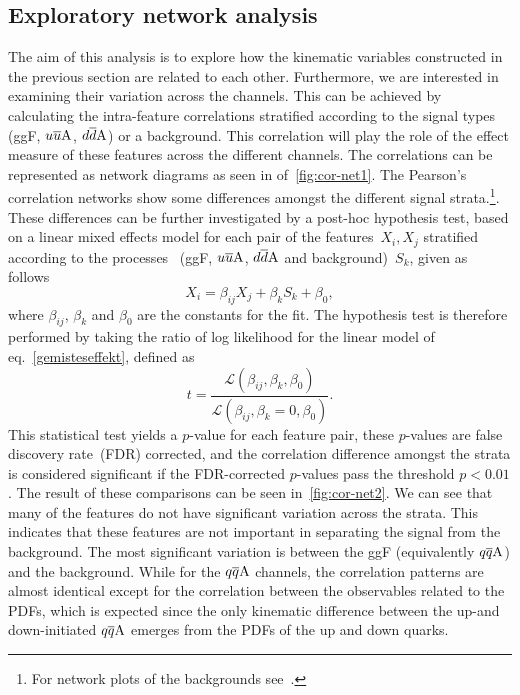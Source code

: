 \subsection{ Exploratory network analysis}
The aim of this analysis is to explore how the kinematic variables constructed in the previous section are related to each other. Furthermore, we are interested in examining their variation across the channels.  This can be achieved by calculating the intra-feature correlations stratified according to the signal types (ggF, $u\overline u \rm A$, $d\overline d \rm A$) or a background. This correlation will play the role of the effect measure of these features across the different channels. The correlations can  be represented as network diagrams as seen in of~\autoref{fig:cor-net1}. The Pearson's correlation networks show some differences amongst the different signal strata.\footnote{For network plots of the backgrounds see~\cite{Grojean:2020ech}.}. These differences can be further investigated by a post-hoc hypothesis test, based on a linear mixed effects model for each pair of the features~$X_i, X_j$ stratified according to the processes ~(ggF, $u\overline u \rm A$, $d\overline d \rm A$ and background)~$S_k$, given as follows
\begin{equation}
	X_i = \beta_{ij} X_j + \beta_k S_k + \beta_0,
	\label{gemisteseffekt}
\end{equation}
where $\beta_{ij}$, $\beta_k$ and $\beta_0$ are the constants for the fit. The hypothesis test is therefore performed by taking  the ratio of log likelihood for the linear model of eq.~\eqref{gemisteseffekt}, defined as
\begin{equation}
	t = \frac{\mathscr{L} (\beta_{ij},\beta_k,\beta_0) }{\mathscr{L}(\beta_{ij},\beta_k=0,\beta_0)}.
\end{equation}
This statistical test yields a $p$-value for each feature pair, these $p$-values are false discovery rate~(FDR) corrected, and the correlation difference amongst the strata is considered significant if the FDR-corrected $p$-values pass the threshold $p<0.01$. The result of these comparisons can be seen in~\autoref{fig:cor-net2}. We can see that many of the features do not have significant variation across the strata. This indicates that these features are not important in separating the signal from the background. The most significant variation is between the ggF (equivalently $q\overline q \rm A$) and the background. While for the $q\overline q \rm A$ channels, the correlation patterns are almost identical except for the correlation between the observables related to the PDFs, which is expected since the only kinematic difference between the up-and down-initiated $q\overline q \rm A$ emerges from the PDFs of the up and down quarks. 
